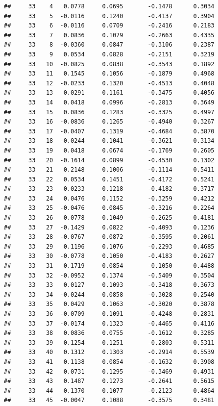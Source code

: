 \documentclass[
]{article}
\begin{document}
\begin{verbatim}
##     33    4   0.0778     0.0695       -0.1478      0.3034 
##     33    5  -0.0116     0.1240       -0.4137      0.3904 
##     33    6  -0.0116     0.0709       -0.2416      0.2183 
##     33    7   0.0836     0.1079       -0.2663      0.4335 
##     33    8  -0.0360     0.0847       -0.3106      0.2387 
##     33    9   0.0534     0.0828       -0.2151      0.3219 
##     33   10  -0.0825     0.0838       -0.3543      0.1892 
##     33   11   0.1545     0.1056       -0.1879      0.4968 
##     33   12  -0.0233     0.1320       -0.4513      0.4048 
##     33   13   0.0291     0.1161       -0.3475      0.4056 
##     33   14   0.0418     0.0996       -0.2813      0.3649 
##     33   15   0.0836     0.1283       -0.3325      0.4997 
##     33   16  -0.0836     0.1265       -0.4940      0.3267 
##     33   17  -0.0407     0.1319       -0.4684      0.3870 
##     33   18  -0.0244     0.1041       -0.3621      0.3134 
##     33   19   0.0418     0.0674       -0.1769      0.2605 
##     33   20  -0.1614     0.0899       -0.4530      0.1302 
##     33   21   0.2148     0.1006       -0.1114      0.5411 
##     33   22   0.0534     0.1451       -0.4172      0.5241 
##     33   23  -0.0233     0.1218       -0.4182      0.3717 
##     33   24   0.0476     0.1152       -0.3259      0.4212 
##     33   25  -0.0476     0.0845       -0.3216      0.2264 
##     33   26   0.0778     0.1049       -0.2625      0.4181 
##     33   27  -0.1429     0.0822       -0.4093      0.1236 
##     33   28  -0.0767     0.0872       -0.3595      0.2061 
##     33   29   0.1196     0.1076       -0.2293      0.4685 
##     33   30  -0.0778     0.1050       -0.4183      0.2627 
##     33   31   0.1719     0.0854       -0.1050      0.4488 
##     33   32  -0.0952     0.1374       -0.5409      0.3504 
##     33   33   0.0127     0.1093       -0.3418      0.3673 
##     33   34  -0.0244     0.0858       -0.3028      0.2540 
##     33   35   0.0429     0.1063       -0.3020      0.3878 
##     33   36  -0.0709     0.1091       -0.4248      0.2831 
##     33   37  -0.0174     0.1323       -0.4465      0.4116 
##     33   38   0.0836     0.0755       -0.1612      0.3285 
##     33   39   0.1254     0.1251       -0.2803      0.5311 
##     33   40   0.1312     0.1303       -0.2914      0.5539 
##     33   41   0.1138     0.0854       -0.1632      0.3908 
##     33   42   0.0731     0.1295       -0.3469      0.4931 
##     33   43   0.1487     0.1273       -0.2641      0.5615 
##     33   44   0.1370     0.1077       -0.2123      0.4864 
##     33   45  -0.0047     0.1088       -0.3575      0.3481 

\end{verbatim}
\end{document}
